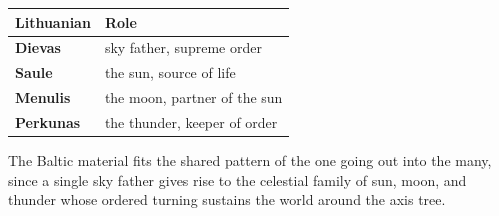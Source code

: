\begin{longtable}{@{}
ll@{}}
\toprule
Lithuanian & Role \\
\midrule
\textbf{Dievas} & sky father, supreme order \\
\textbf{Saule} & the sun, source of life \\
\textbf{Menulis} & the moon, partner of the sun \\
\textbf{Perkunas} & the thunder, keeper of order \\
\bottomrule
\end{longtable}

The Baltic material fits the shared pattern of the one going out into the many, since a single sky father gives rise to the celestial family of sun, moon, and thunder whose ordered turning sustains the world around the axis tree.
